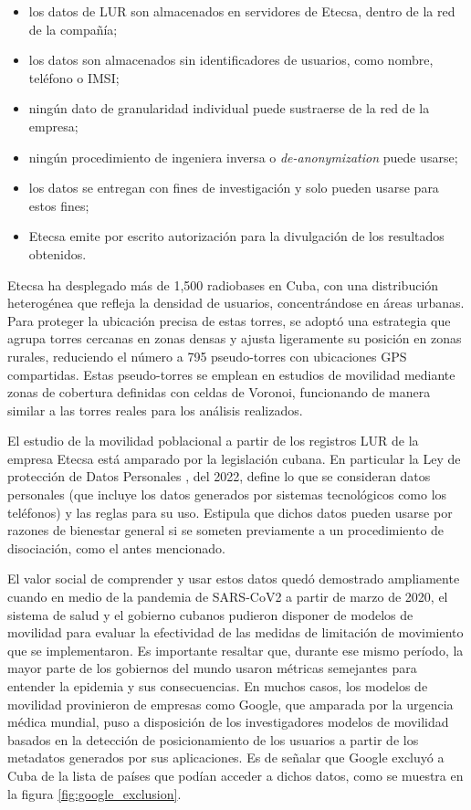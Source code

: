 \begin{itemize}
    \item los datos de LUR son almacenados en servidores de Etecsa, dentro de la red de la compañía;
    \item los datos son almacenados sin identificadores de usuarios, como nombre, teléfono o IMSI;
    \item ningún dato de granularidad individual puede sustraerse de la red de la empresa;
    \item ningún procedimiento de ingeniera inversa o \textit{de-anonymization} puede usarse;
    \item los datos se entregan con fines de investigación y solo pueden usarse para estos fines;
    \item Etecsa emite por escrito autorización para la divulgación de los resultados obtenidos.
\end{itemize}

Etecsa ha desplegado más de 1,500 radiobases en Cuba, con una distribución heterogénea que refleja la densidad de usuarios, concentrándose en áreas urbanas. Para proteger la ubicación precisa de estas torres, se adoptó una estrategia que agrupa torres cercanas en zonas densas y ajusta ligeramente su posición en zonas rurales, reduciendo el número a 795 pseudo-torres con ubicaciones GPS compartidas. Estas pseudo-torres se emplean en estudios de movilidad mediante zonas de cobertura definidas con celdas de Voronoi, funcionando de manera similar a las torres reales para los análisis realizados.

El estudio de la movilidad poblacional a partir de los registros LUR de la empresa Etecsa está amparado por la legislación cubana. En particular la Ley de protección de Datos Personales \cite{cuervo2022resolucion}, del 2022, define lo que se consideran datos personales (que incluye los datos generados por sistemas tecnológicos como los teléfonos) y las reglas para su uso. Estipula que dichos datos pueden usarse por razones de bienestar general si se someten previamente a un procedimiento de disociación, como el antes mencionado.

El valor social de comprender y usar estos datos quedó demostrado ampliamente cuando en medio de la pandemia de SARS-CoV2 a partir de marzo de 2020, el sistema de salud y el gobierno cubanos pudieron disponer de modelos de movilidad para evaluar la efectividad de las medidas de limitación de movimiento que se implementaron. Es importante resaltar que, durante ese mismo período, la mayor parte de los gobiernos del mundo usaron métricas semejantes para entender la epidemia y sus consecuencias. En muchos casos, los modelos de movilidad provinieron de empresas como Google, que amparada por la urgencia médica mundial, puso a disposición de los investigadores modelos de movilidad basados en la detección de posicionamiento de los usuarios a partir de los metadatos generados por sus aplicaciones. Es de señalar que Google excluyó a Cuba de la lista de países que podían acceder a dichos datos, como se muestra en la figura \ref{fig:google_exclusion}.

